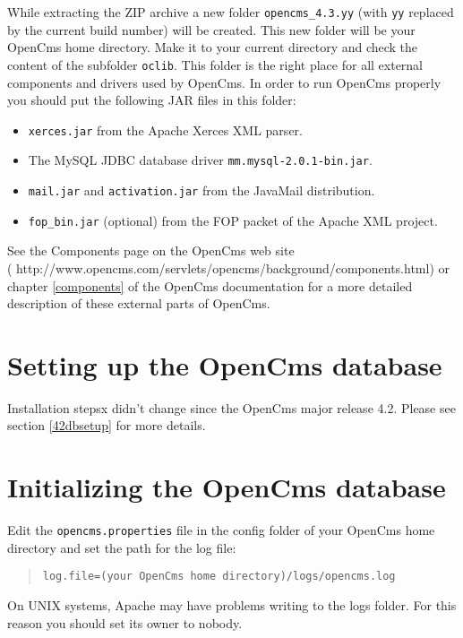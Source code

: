 While extracting the ZIP archive
a new folder \texttt{opencms\_4.3.yy} (with \texttt{yy}
replaced by the current build number) will be created. This new folder will be your OpenCms home
directory. Make it to your current directory and check the content of
the subfolder \texttt{oclib}. This folder is the right place for all external
components and drivers used by OpenCms. In order to run OpenCms properly
you should put the following JAR files in this folder:

\begin{itemize}
\item \texttt{xerces.jar} from the Apache Xerces XML parser. 
\item The MySQL JDBC database driver \texttt{mm.mysql-2.0.1-bin.jar}.
\item \texttt{mail.jar} and \texttt{activation.jar} from the JavaMail distribution.
\item \texttt{fop\_bin.jar} (optional) from the FOP packet of the Apache XML project.
\end{itemize}

See the Components page on the OpenCms web site\\
(
{http://www.opencms.com/servlets/opencms/background/components.html}) 
or chapter \ref{components} of the OpenCms documentation for a more detailed description
of these external parts of OpenCms.


\section{Setting up the OpenCms database}
Installation stepsx didn't change since the OpenCms major release 4.2. Please
see section \ref{42dbsetup} for more details.

\section{Initializing the OpenCms database}
Edit the \texttt{opencms.properties} file in the config folder of your OpenCms home 
directory and set the path for the log file:

\begin{quote}
\texttt{log.file=(your OpenCms home directory)/logs/opencms.log}
\end{quote}

On UNIX systems, Apache may have problems writing to the logs folder. 
For this reason you should set its owner to nobody. 

